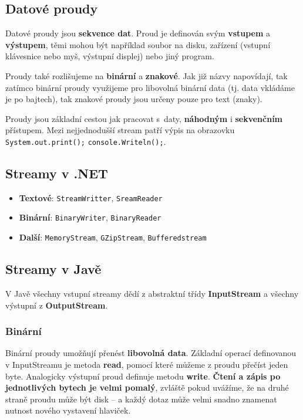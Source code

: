 \subsection{Datové proudy}
Datové proudy jsou \textbf{sekvence dat}. Proud je definován svým \textbf{vstupem} a \textbf{výstupem}, těmi mohou být například soubor na disku, zařízení (vstupní klávesnice nebo myš, výstupní displej) nebo jiný program.

Proudy také rozlišujeme na \textbf{binární} a \textbf{znakové}. Jak již názvy napovídají, tak zatímco binární proudy využijeme pro libovolná binární data (tj. data vkládáme je po bajtech), tak znakové proudy jsou určeny pouze pro text (znaky).

Proudy jsou základní cestou jak pracovat s daty, \textbf{náhodným} i \textbf{sekvenčním} přístupem. Mezi nejjednodušší stream patří výpis na obrazovku \texttt{System.out.print();} \texttt{console.Writeln();}.

\subsection{Streamy v .NET}
\begin{itemize}
	\item \textbf{Textové}: \texttt{StreamWritter}, \texttt{SreamReader} 
	\item \textbf{Binární}:	 \texttt{BinaryWriter},	 \texttt{BinaryReader} 
	\item \textbf{Další}:	 \texttt{MemoryStream},	 \texttt{GZipStream},		 \texttt{Bufferedstream} 
\end{itemize}

\subsection{Streamy v Javě}
V Javě všechny vstupní streamy dědí z abstraktní třídy \textbf{InputStream} a všechny výstupní z \textbf{OutputStream}.

\subsubsection{Binární}
Binární proudy umožňují přenést \textbf{libovolná data}. Základní operací definovanou v InputStreamu je metoda \textbf{read}, pomocí které můžeme z proudu přečíst jeden byte. Analogicky výstupní proud definuje metodu \textbf{write}. \textbf{Čtení a zápis po jednotlivých bytech je velmi pomalý}, zvláště pokud uvážíme, že na druhé straně proudu může být disk – a každý dotaz může velmi snadno znamenat nutnost nového vystavení hlaviček.


